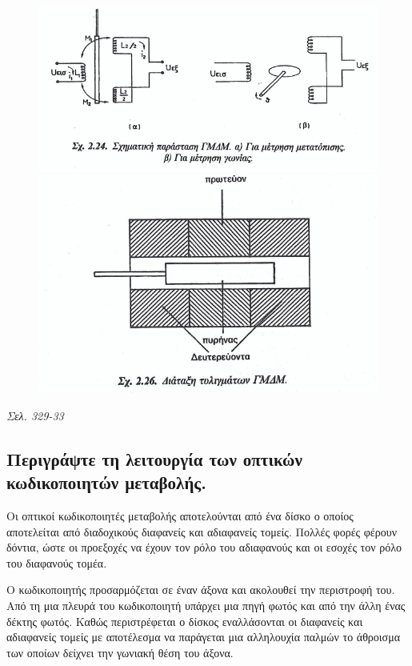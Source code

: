 \documentclass{article}
\begin{document}
\begin{figure}[h!]
    \includegraphics[width=\linewidth]{GMDM1.png}
    \includegraphics[width=\linewidth]{GMDM2.png}
\end{figure}
\emph{Σελ. 329-33}

\subsection{Περιγράψτε τη λειτουργία των οπτικών κωδικοποιητών μεταβολής.}
Οι οπτικοί κωδικοποιητές μεταβολής αποτελούνται από ένα δίσκο ο οποίος αποτελείται από διαδοχικούς διαφανείς και αδιαφανείς τομείς. Πολλές φορές φέρουν δόντια, ώστε οι
προεξοχές να έχουν τον ρόλο του αδιαφανούς και οι εσοχές τον ρόλο του διαφανούς τομέα. 

Ο κωδικοποιητής προσαρμόζεται σε έναν άξονα και ακολουθεί την περιστροφή του. Από τη μια πλευρά του κωδικοποιητή υπάρχει μια πηγή φωτός και από την άλλη ένας δέκτης φωτός.
Καθώς περιστρέφεται ο δίσκος εναλλάσονται οι διαφανείς και αδιαφανείς τομείς με αποτέλεσμα να παράγεται μια αλληλουχία παλμών το άθροισμα των οποίων 
δείχνει την γωνιακή θέση του άξονα. 
\end{document}

